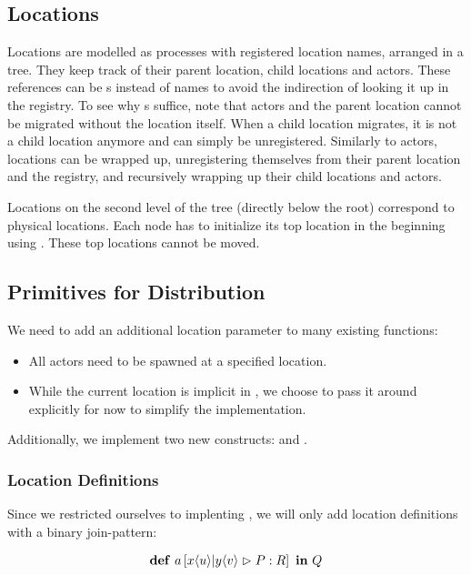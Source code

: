 \subsection{Locations}

Locations are modelled as processes with registered location names,
arranged in a tree.
They keep track of their parent location, child locations and actors.
These references can be \PID{}s instead of names
to avoid the indirection of looking it up in the registry.
To see why \PID{}s suffice, note that actors and the parent location
cannot be migrated without the location itself.
When a child location migrates, it is not a child location anymore and can
simply be unregistered.
Similarly to actors, locations can be wrapped up,
unregistering themselves from their parent location and the registry,
and recursively wrapping up their child locations and actors.

Locations on the second level of the tree (directly below the root)
correspond to physical locations.
Each node has to initialize its top location in the beginning using
. These top locations cannot be moved.


\subsection{Primitives for Distribution}

We need to add an additional location parameter to many existing functions:
\begin{itemize}[nosep]
  \item
    All actors need to be spawned at a specified location.
  \item
    While the current location is implicit in \distjoincalc,
    we choose to pass it around explicitly for now
    to simplify the implementation.
\end{itemize}

Additionally, we implement two new constructs:
 and .

\subsubsection{Location Definitions}
Since we restricted ourselves to implenting \corejoincalc,
we will only add location definitions with a binary join-pattern:

\begin{align*}
  \textbf{\textup{def}} \ a \left[ x\langle u\rangle | y\langle v\rangle \vartriangleright P : R \right] \ \textbf{\textup{in}} \ Q
\end{align*}

